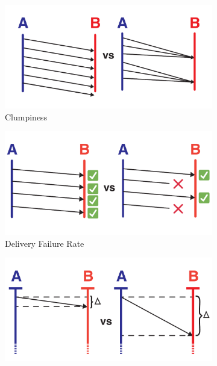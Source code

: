 \begin{figure}
  \centering
  \begin{subfigure}[b]{0.5\textwidth}
    \centering
    \includegraphics[width=\linewidth]{img/quality-of-service-metric-definitions/clumpiness.pdf}
    \caption{Clumpiness}
    \label{fig:quality-of-service-metric-definitions-clumpiness}
  \end{subfigure}%
  \begin{subfigure}[b]{0.5\textwidth}
    \centering
    \includegraphics[width=\linewidth]{img/quality-of-service-metric-definitions/delivery-failure-rate.pdf}
    \caption{Delivery Failure Rate}
    \label{fig:quality-of-service-metric-definitions-delivery-failure-rate}
  \end{subfigure}
  \begin{subfigure}[b]{0.5\textwidth}
    \centering
    \includegraphics[width=\linewidth]{img/quality-of-service-metric-definitions/latency.pdf}

\end{subfigure}
\end{figure}
